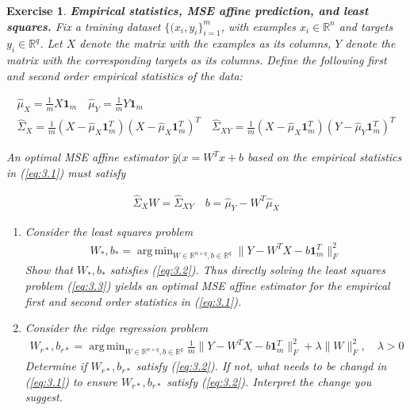 \documentclass[12pt]{article}
\DeclareMathOperator*{\argmin}{arg\,min}
\theoremstyle{colon}
\newtheorem{exercise}{Exercise}
\begin{document}
\begin{exercise}
  \textbf{Empirical statistics, MSE affine prediction, and least squares.} Fix a training dataset $\{(x_i, y_i\}_{i=1}^m$, with examples $x_i \in \mathbb{R}^n$ and targets $y_i \in \mathbb{R}^q$. Let $X$ denote the matrix with the examples as its columns, $Y$ denote the matrix with the corresponding targets as its columns. Define the following first and second order empirical statistics of the data:

  \begin{gather}
    \label{eq:3.1}
    \hat{\mu}_X = \frac{1}{m} X \bm{1}_m \quad \hat{\mu}_Y = \frac{1}{m} Y \bm{1}_m \\
    \hat{\Sigma}_X = \frac{1}{m} (X - \hat{\mu}_X \bm{1}_m^T)(X - \hat{\mu}_X \bm{1}_m^T)^T \quad \hat{\Sigma}_{XY} = \frac{1}{m} (X - \hat{\mu}_X \bm{1}_m^T)(Y - \hat{\mu}_Y \bm{1}_m^T)^T \nonumber
  \end{gather}

  An optimal MSE affine estimator $\hat{y}(x = W^T x + b$ based on the empirical statistics in (\ref{eq:3.1}) must satisfy

  \begin{gather}
    \label{eq:3.2}
    \hat{\Sigma}_X W = \hat{\Sigma}_{XY} \quad b = \hat{\mu}_Y - W^T \hat{\mu}_X
  \end{gather}

  \begin{enumerate}[label=\alph*)]
    \item Consider the least squares problem
      \begin{gather}
        \label{eq:3.3}
        W_*, b_* = \argmin_{W \in \mathbb{R}^{n \times q}, b \in \mathbb{R}^q} \lVert Y - W^T X - b \bm{1}_m^T \rVert_F^2
      \end{gather}
      Show that $W_*, b_*$ satisfies (\ref{eq:3.2}). Thus directly solving the least squares problem (\ref{eq:3.3}) yields an optimal MSE affine estimator for the empirical first and second order statistics in (\ref{eq:3.1}).

    \item Consider the ridge regression problem
      \begin{gather*}
        W_{r*}, b_{r*} = \argmin_{W \in \mathbb{R}^{n \times q}, b \in \mathbb{R}^q} \frac{1}{m} \lVert Y - W^T X - b \bm{1}_m^T \rVert_F^2 + \lambda \lVert W \rVert_F^2, \quad \lambda > 0
      \end{gather*}
      Determine if $W_{r*}, b_{r*}$ satisfy (\ref{eq:3.2}). If not, what needs to be changd in (\ref{eq:3.1}) to ensure $W_{r*}, b_{r*}$ satisfy (\ref{eq:3.2}). Interpret the change you suggest.
  \end{enumerate}
\end{exercise}
\end{document}
